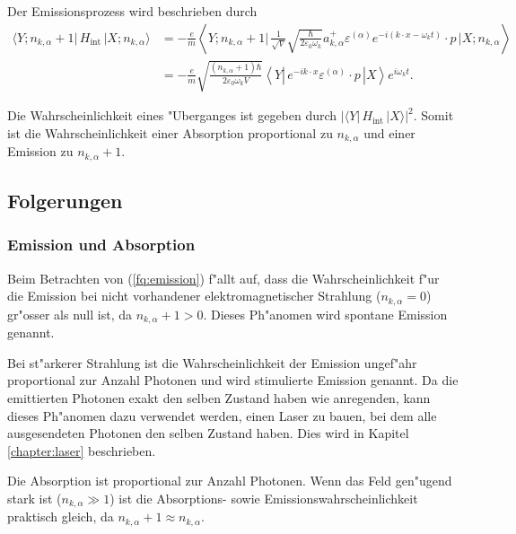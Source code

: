 Der Emissionsprozess wird beschrieben durch
\begin{equation} \label{fq:emission}
\begin{split}
\langle Y; n_{k,\alpha} + 1 |\, H_{\text{int}} \,| X; n_{k,\alpha} \rangle &= 
-\frac{e}{m} \left\langle Y; n_{k,\alpha} + 1 \biggl| 
\, \frac{1}{\sqrt{V}} \sqrt{\frac{\hbar}{2 \varepsilon_0 \omega_k}}a^+_{k,\alpha} \varepsilon^{(\alpha)} e^{-i(k \cdot x-\omega_k t)} \cdot p \,
\biggl| X; n_{k,\alpha} \right\rangle\\
&= -\frac{e}{m} \sqrt{\frac{ (n_{k,\alpha}+1) \hbar}{2 \varepsilon_0 \omega_k V}} \left\langle Y \left| 
\, e^{-ik \cdot x} \varepsilon^{(\alpha)} \cdot p \,
\right| X \right\rangle e^{i\omega_k t}.
\end{split}
\end{equation}

Die Wahrscheinlichkeit eines "Uberganges ist gegeben durch $| \langle Y| \, H_{\text{int}} \, |X \rangle |^2$.
Somit ist die Wahrscheinlichkeit einer Absorption proportional zu $n_{k,\alpha}$ und einer Emission zu $n_{k,\alpha}+1$.

\subsection{Folgerungen}
\subsubsection{Emission und Absorption}
Beim Betrachten von (\ref{fq:emission}) f"allt auf, dass die Wahrscheinlichkeit f"ur die Emission bei nicht vorhandener elektromagnetischer Strahlung ($n_{k,\alpha} = 0$) gr"osser als null ist, da $n_{k,\alpha}+1 > 0$. Dieses Ph"anomen wird spontane Emission genannt.

Bei st"arkerer Strahlung ist die Wahrscheinlichkeit der Emission ungef"ahr proportional zur Anzahl Photonen und wird stimulierte Emission genannt. Da die emittierten Photonen exakt den selben Zustand haben wie anregenden, kann dieses Ph"anomen dazu verwendet werden, einen Laser zu bauen, bei dem alle ausgesendeten Photonen den selben Zustand haben. Dies wird in Kapitel \ref{chapter:laser} beschrieben.

Die Absorption ist proportional zur Anzahl Photonen. Wenn das Feld gen"ugend stark ist ($n_{k,\alpha} \gg 1$) ist die Absorptions- sowie Emissionswahrscheinlichkeit praktisch gleich, da $n_{k,\alpha}+1 \approx n_{k,\alpha}$. 

